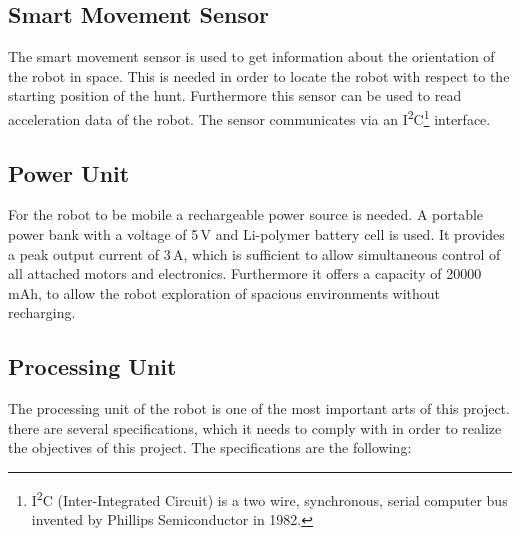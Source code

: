 \subsection{Smart Movement Sensor}\label{subsec:smart_movement_sensor}

The smart movement sensor is used to get information about the orientation of the robot in space. This is needed in order to locate the robot with respect to the starting position of the hunt. Furthermore this sensor can be used to read acceleration data of the robot. The sensor communicates via an I\textsuperscript{2}C\footnote{I\textsuperscript{2}C (Inter-Integrated Circuit) is a two wire, synchronous, serial computer bus invented by Phillips Semiconductor in 1982.} interface.

\subsection{Power Unit}\label{subsec:power_unit}

For the robot to be mobile a rechargeable power source is needed. A portable power bank with a voltage of 5\,V and Li-polymer battery cell is used. It provides a peak output current of 3\,A, which is sufficient to allow simultaneous control of all attached motors and electronics. Furthermore it offers a capacity of 20000\,mAh, to allow the robot exploration of spacious environments without recharging.

\subsection{Processing Unit}\label{subsec:processing_unit}

The processing unit of the robot is one of the most important arts of this project. there are several specifications, which it needs to comply with in order to realize the objectives of this project. The specifications are the following:

